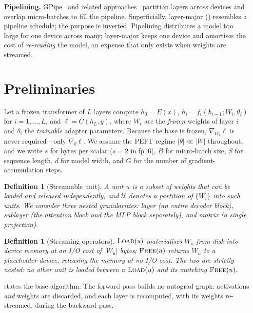 \documentclass[journal]{IEEEtran}
\newtheorem{definition}[theorem]{Definition}
\newcommand{\Wu}{\lvert W_u \rvert}
\begin{document}
\textbf{Pipelining.} GPipe~\cite{huang2019gpipe} and related
approaches~\cite{jia2019beyond} partition layers across devices and overlap micro-batches to fill
the pipeline. Superficially, layer-major () resembles a pipeline schedule; the purpose
is inverted. Pipelining distributes a model too large for one device across many; layer-major keeps
one device and amortises the cost of \emph{re-reading} the model, an expense that only exists when
weights are streamed.

\section{Preliminaries}
\label{sec:prelim}

Let a frozen transformer of $L$ layers compute $h_0 = E(x)$,
$h_i = f_i(h_{i-1}; W_i, \theta_i)$ for $i=1,\dots,L$, and $\ell = C(h_L,y)$, where $W_i$ are the
\emph{frozen} weights of layer $i$ and $\theta_i$ the \emph{trainable} adapter parameters. Because
the base is frozen, $\nabla_{W_i}\ell$ is never required---only $\nabla_{\theta}\ell$. We assume
the PEFT regime $|\theta| \ll |W|$ throughout, and we write $s$ for bytes per scalar ($s=2$ in
fp16), $B$ for micro-batch size, $S$ for sequence length, $d$ for model width, and $G$ for the
number of gradient-accumulation steps.

\begin{definition}[Streamable unit]
\label{def:unit}
A \emph{unit} $u$ is a subset of weights that can be loaded and released independently, and
$\mathcal{U}$ denotes a partition of $\{W_i\}$ into such units. We consider three nested
granularities: \emph{layer} (an entire decoder block), \emph{sublayer} (the attention block and
the MLP block separately), and \emph{matrix} (a single projection).
\end{definition}

\begin{definition}[Streaming operators]
\label{def:ops}
$\textsc{Load}(u)$ materialises $W_u$ from disk into device memory at an I/O cost of $\Wu$ bytes;
$\textsc{Free}(u)$ returns $W_u$ to a placeholder device, releasing the memory at no I/O cost. The
two are strictly nested: no other unit is loaded between a $\textsc{Load}(u)$ and its matching
$\textsc{Free}(u)$.
\end{definition}

 states the base algorithm. The forward pass builds no autograd graph: activations
\emph{and} weights are discarded, and each layer is recomputed, with its weights re-streamed,
during the backward pass.
\end{document}
